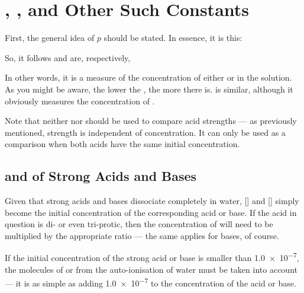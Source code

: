 

	\pagebreak
	\section{\texorpdfstring{\pH{}}{pH}, \texorpdfstring{\pOH{}}{pOH}, and Other Such Constants}

		First, the general idea of $p$ should be stated. In essence, it is this:

		\mathdiagram{
			\[ \Mp{X} = -\lg{X}, \hspace{5mm} X = 10^{-\Mp{X}} \]
		}

		So, it follows \pH{} and \pOH{} are, respectively,


		In other words, it is a measure of the concentration of either  or  in the solution. As you might be aware, the
		lower the \pH{}, the more  there is. \pOH{} is similar, although it obviously measures the concentration of .

		Note that neither \pH{} nor \pOH{} should be used to compare acid strengths --- as previously mentioned, strength is independent
		of concentration. It can only be used as a comparison when both acids have the same initial concentration.


		\subsection{\texorpdfstring{\pH{}}{pH} and \texorpdfstring{\pOH{}}{pOH} of Strong Acids and Bases}

			Given that strong acids and bases dissociate completely in water, [] and [] simply become the initial concentration
			of the corresponding acid or base. If the acid in question is di- or even tri-protic, then the concentration of  will need
			to be multiplied by the appropriate ratio --- the same applies for bases, of course.

			If the initial concentration of the strong acid or base is smaller than \SI{1.0e-7}{\molarConc},
			the molecules of  or  from the auto-ionisation of water must be taken into account --- it is as simple as adding
			\num{1.0e-7} to the concentration of the acid or base.

